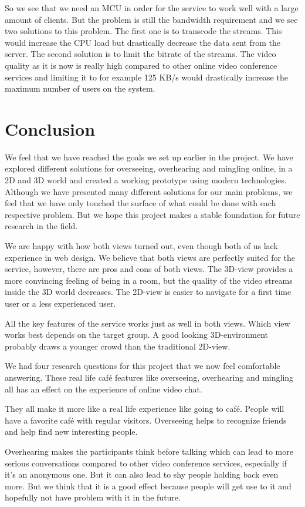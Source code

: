 \documentclass[12pt, titlepage]{article}
\begin{document}
So we see that we need an MCU in order for the service to work well with a large amount of clients. But the problem is still the bandwidth requirement and we see two solutions to this problem. The first one is to transcode the streams. This would increase the CPU load but drastically decrease the data sent from the server. The second solution is to limit the bitrate of the streams. The video quality as it is now is really high compared to other online video conference services and limiting it to for example 125 KB/s would drastically increase the maximum number of users on the system.

\section{Conclusion}
We feel that we have reached the goals we set up earlier in the project. We have explored different solutions for overseeing, overhearing and mingling online, in a 2D and 3D world and created a working prototype using modern technologies. Although we have presented many different solutions for our main problems, we feel that we have only touched the surface of what could be done with each respective problem. But we hope this project makes a stable foundation for future research in the field.

We are happy with how both views turned out, even though both of us lack experience in web design. We believe that both views are perfectly suited for the service, however, there are pros and cons of both views. The 3D-view provides a more convincing feeling of being in a room, but the quality of the video streams inside the 3D world decreases. The 2D-view is easier to navigate for a first time user or a less experienced user. 

All the key features of the service works just as well in both views. Which view works best depends on the target group. A good looking 3D-environment probably draws a younger crowd than the traditional 2D-view.

We had four research questions for this project that we now feel comfortable answering. These real life café features like overseeing, overhearing and mingling all has an effect on the experience of online video chat.

They all make it more like a real life experience like going to café. People will have a favorite café with regular visitors. Overseeing helps to recognize friends and help find new interesting people. 

Overhearing makes the participants think before talking which can lead to more serious conversations compared to other video conference services, especially if it's an anonymous one. But it can also lead to shy people holding back even more. But we think that it is a good effect because people will get use to it and hopefully not have problem with it in the future.
\end{document}
